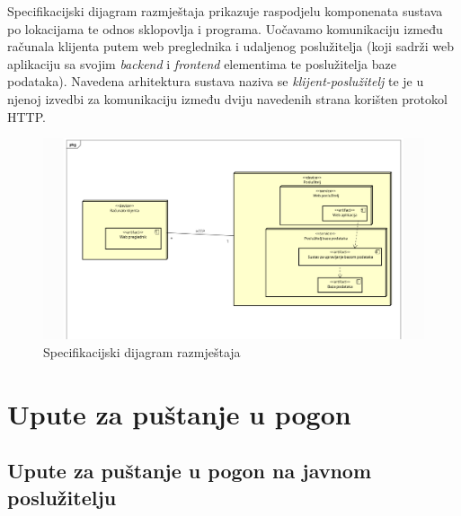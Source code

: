                 Specifikacijski dijagram razmještaja prikazuje raspodjelu komponenata sustava po lokacijama te odnos sklopovlja i programa. Uočavamo komunikaciju između računala klijenta putem web preglednika i udaljenog poslužitelja (koji sadrži web aplikaciju sa svojim \textit{backend} i \textit{frontend} elementima te poslužitelja baze podataka). Navedena arhitektura sustava naziva se \textit{klijent-poslužitelj} te je u njenoj izvedbi za komunikaciju između dviju navedenih strana korišten protokol HTTP.
			\begin{figure}[H]
		\includegraphics[scale=0.3]{./Dijagrami/dijagram_razmjestaja.png}
		\centering
		\caption{Specifikacijski dijagram razmještaja}
		\label{fig:promjene}
	\end{figure}
			\eject 
		
		
		
		\section{Upute za puštanje u pogon}
            \subsection{Upute za puštanje u pogon na javnom poslužitelju}

